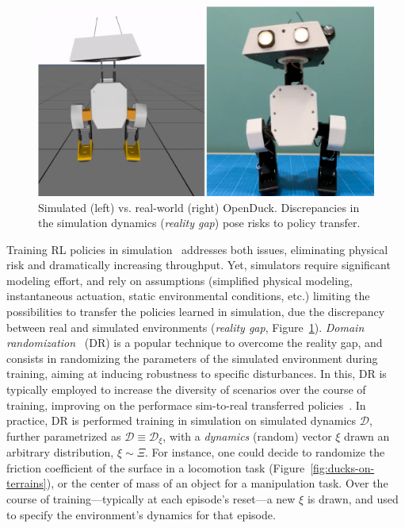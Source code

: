 \begin{figure}
    \centering
    \includegraphics[width=0.7\linewidth]{figures/ch3/ch3-duck-sim-vs-real.pdf}
    \caption{Simulated (left) vs. real-world (right) OpenDuck. Discrepancies in the simulation dynamics (\emph{reality gap}) pose risks to policy transfer.}
    \label{fig:synthetic-vs-real-duck}
\end{figure}

Training RL policies in simulation~\citep{tobinDomainRandomizationTransferring2017} addresses both issues, eliminating physical risk and dramatically increasing throughput.
Yet, simulators require significant modeling effort, and rely on assumptions (simplified physical modeling, instantaneous actuation, static environmental conditions, etc.) limiting the possibilities to transfer the policies learned in simulation, due the discrepancy between real and simulated environments (\emph{reality gap}, Figure~\ref{fig:synthetic-vs-real-duck}).
\emph{Domain randomization}~\citep{tobinDomainRandomizationTransferring2017} (DR) is a popular technique to overcome the reality gap, and consists in randomizing the parameters of the simulated environment during training, aiming at inducing robustness to specific disturbances.
In this, DR is typically employed to increase the diversity of scenarios over the course of training, improving on the performace sim-to-real transferred policies~\citep{akkayaSolvingRubiksCube2019,antonovaReinforcementLearningPivoting2017,jiDribbleBotDynamicLegged2023}.
In practice, DR is performed training in simulation on simulated dynamics \( \mathcal D \), further parametrized as \( \mathcal D \equiv \mathcal D_\xi \), with a \emph{dynamics} (random) vector \( \xi \) drawn an arbitrary distribution, \( \xi \sim \Xi \).
For instance, one could decide to randomize the friction coefficient of the surface in a locomotion task (Figure~\ref{fig:ducks-on-terrains}), or the center of mass of an object for a manipulation task.
Over the course of training---typically at each episode's reset---a new \( \xi \) is drawn, and used to specify the environment's dynamics for that episode.

